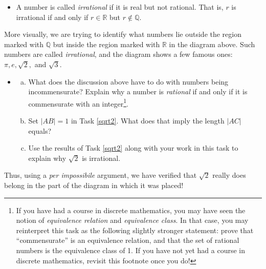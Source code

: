 \documentclass[11pt]{article}
\newcounter{tasknumb}
\newcommand{\tasknumb}[1]{\refstepcounter{tasknumb}\textmd{\textbf{$\fbox{$\fbox{Task \thetasknumb}$}$}}#1}
\newenvironment{task}[1][]%
 {\begin{itemize}
 \item[\tasknumb{#1}]  }
{
    \end{itemize}    }%
\begin{document}
\begin{itemize}
    \item 
A  number is called \emph{irrational} if it is real but not rational.  That is, $r$ is irrational if and only if $r\in\mathbb{R}$ but $r\not \in \mathbb{Q}$.
\end{itemize}

More visually, we are trying to identify what numbers lie outside the region marked with $\mathbb{Q}$ but inside the region marked with $\mathbb{R}$ in the diagram above.  Such numbers are called \emph{irrational}, and the diagram shows a few famous ones: $\pi, e, \sqrt{2},$ and $\sqrt{3}.$  

\begin{task}
\begin{enumerate}[(a)]
    \item What does the discussion above have to do with numbers being incommensurate?  Explain why a number is \emph{rational} if and only if it is commensurate with an integer\footnote{If you have had a course in discrete mathematics, you may have seen the notion of \emph{equivalence relation} and \emph{equivalence class}.  In that case, you may reinterpret this task as the following slightly stronger statement: prove that ``commensurate'' is an equivalence relation, and that the set of rational numbers is the equivalence class of 1.  If you have not yet had a course in discrete mathematics, revisit this footnote once you do!}.
    \item Set $|AB|=1$ in Task \ref{sqrt2}.  What does that imply the length $|AC|$ equals?
    \item Use the results of Task \ref{sqrt2} along with your work in this task to explain why $\sqrt{2}$ is irrational.
    \end{enumerate}
\end{task}
Thus, using a \emph{per impossibile} argument, we have verified that $\sqrt{2}$ really does belong in the part of the diagram in which it was placed! 



\end{document}
